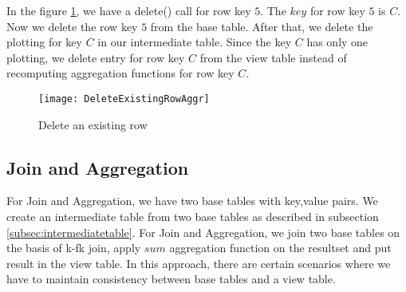 \documentclass[11pt,a4paper,bibtotoc,idxtotoc,headsepline,footsepline,footexclude,BCOR12mm,DIV13]{scrbook}
\begin{document}
In the figure \ref{sec:deleteexistingrow}, we have a delete() call for row key $5$. The $key$ for row key $5$ is $C$. Now we delete the row key $5$ from the base table. After that, we delete the plotting for key $C$ in our intermediate table. Since the key $C$ has only one plotting, we delete entry for row key $C$ from the view table instead of recomputing aggregation functions for row key $C$. 

\begin{figure}
    \centering
    \texttt{[image: DeleteExistingRowAggr]}
    \caption{Delete an existing row}
    \label{sec:deleteexistingrow}
    
\end{figure} 

\newpage
\subsection{Join and Aggregation}
\label{subsec:joinandaggregation}

For Join and Aggregation, we have two base tables with key,value pairs. We create an intermediate table from two base tables as described in subsection \ref{subsec:intermediatetable}. For Join and Aggregation, we join two base tables on the basis of k-fk join, apply $sum$ aggregation function on the resultset and put result in the view table. In this approach, there are certain scenarios where we have to maintain consistency between base tables and a view table.



    

\end{document}
